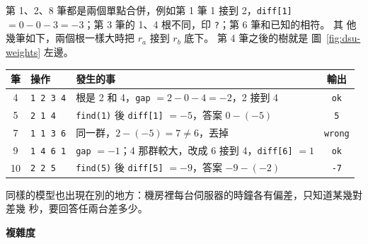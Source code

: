 
第 1、2、8 筆都是兩個單點合併，例如第 1 筆 1 接到 2，\texttt{diff[1]}
$= 0 - 0 - 3 = -3$；第 3 筆的 1、4 根不同，印 \texttt{?}；第 6 筆和已知的相符。 其
他幾筆如下，兩個根一樣大時把 $r_a$ 接到 $r_b$ 底下。 第 4 筆之後的樹就是
圖~\ref{fig:dsu-weights} 左邊。

\begin{center}
\begin{tabular}{cllc}
\toprule
筆 & 操作 & 發生的事 & 輸出 \\
\midrule
4 & \texttt{1 2 3 4} & 根是 2 和 4，\texttt{gap} $= 2 - 0 - 4 = -2$，2 接到 4 & \texttt{ok} \\
5 & \texttt{2 1 4} & \texttt{find(1)} 後 \texttt{diff[1]} $= -5$，答案 $0 - (-5)$ & \texttt{5} \\
7 & \texttt{1 1 3 6} & 同一群，$2 - (-5) = 7 \ne 6$，丟掉 & \texttt{wrong} \\
9 & \texttt{1 4 6 1} & \texttt{gap} $= -1$；4 那群較大，改成 6 接到 4，\texttt{diff[6]} $= 1$ & \texttt{ok} \\
10 & \texttt{2 2 5} & \texttt{find(5)} 後 \texttt{diff[5]} $= -9$，答案 $-9 - (-2)$ & \texttt{-7} \\
\bottomrule
\end{tabular}
\end{center}

同樣的模型也出現在別的地方：機房裡每台伺服器的時鐘各有偏差，只知道某幾對差幾
秒，要回答任兩台差多少。

\textbf{複雜度}

